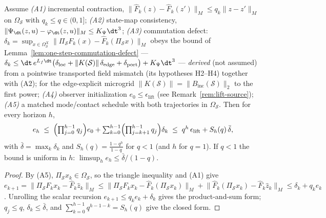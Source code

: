 \begin{theorem}\label{thm:transfer-bound}
Assume
\emph{(A1)} incremental contraction, $\lVert\widehat F_k(z)-\widehat F_k(z')\rVert_M\le q_k\lVert z-z'\rVert_M$ on $\Omega_{\mathcal S}$ with $q_k\le q\in(0,1]$;
\emph{(A2)} state-map consistency, $\lVert\Psi_{\dt}(z,u)-\varphi_{\dt}(z,u)\rVert_M\le K_\Psi\dt^3$;
\emph{(A3)} commutation defect: $\delta_k=\sup_{x\in\Omega^{X}_{\mathcal S}}\lVert\Pi_{\mathcal S}F_k(x)-\widehat F_k(\Pi_{\mathcal S}x)\rVert_M$ obeys the bound of Lemma~\ref{lem:one-step-commutation-defect} --- $\delta_k\le\dt\,e^{L_f\dt}\bigl(\delta_{\mathrm{loc}}+\lVert K(\mathcal S)\rVert\,\delta_{\mathrm{edge}}+\delta_{\mathrm{port}}\bigr)+K_\Psi\dt^3$ --- \emph{derived} (not assumed) from a pointwise transported field mismatch (its hypotheses H2--H4) together with (A2); for the edge-explicit microgrid $\lVert K(\mathcal S)\rVert=\lVert B_{\mathrm{inc}}(\mathcal S)\rVert_2$ to the first power;
\emph{(A4)} observer initialization $e_0\le\epsilon_{\mathrm{lift}}$ (see Remark~\ref{rem:lift-source});
\emph{(A5)} a matched mode/contact schedule with both trajectories in $\Omega_{\mathcal S}$.
Then for every horizon $h$,
\begin{equation}
e_h\;\le\;\Bigl(\textstyle\prod_{j=0}^{h-1}q_j\Bigr)e_0+\sum_{k=0}^{h-1}\Bigl(\textstyle\prod_{j=k+1}^{h-1}q_j\Bigr)\delta_k
\;\le\;q^{h}\,\epsilon_{\mathrm{lift}}+S_h(q)\,\bar\delta,
\end{equation}
with $\bar\delta=\max_k\delta_k$ and $S_h(q)=\tfrac{1-q^{h}}{1-q}$ for $q<1$ (and $h$ for $q=1$). If $q<1$ the bound is uniform in $h$: $\limsup_h e_h\le\bar\delta/(1-q)$.
\end{theorem}

\begin{proof}
By (A5), $\Pi_{\mathcal S}x_k\in\Omega_{\mathcal S}$, so the triangle inequality and (A1) give
$e_{k+1}=\lVert\Pi_{\mathcal S}F_k x_k-\widehat F_k\hat z_k\rVert_M
\le\lVert\Pi_{\mathcal S}F_k x_k-\widehat F_k(\Pi_{\mathcal S}x_k)\rVert_M
+\lVert\widehat F_k(\Pi_{\mathcal S}x_k)-\widehat F_k\hat z_k\rVert_M
\le\delta_k+q_k e_k$.
Unrolling the scalar recursion $e_{k+1}\le q_k e_k+\delta_k$ gives the product-and-sum form; $q_j\le q$, $\delta_k\le\bar\delta$, and $\sum_{k=0}^{h-1}q^{h-1-k}=S_h(q)$ give the closed form.
\end{proof}

